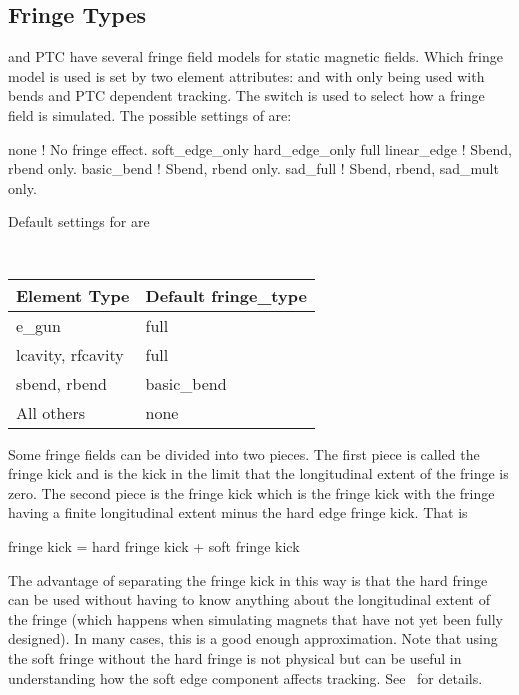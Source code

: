 {%
\subsection{Fringe Types}
\label{s:fringe.type}

\bmad and PTC have several fringe field models for static magnetic fields. Which fringe model is
used is set by two element attributes:  and  with
 only being used with bends and PTC dependent tracking.
The  switch is used to select how a fringe field is
simulated.  The possible settings of  are:
\begin{example}
  none              ! No fringe effect. 
  soft_edge_only
  hard_edge_only
  full
  linear_edge       ! Sbend, rbend only.
  basic_bend        ! Sbend, rbend only. 
  sad_full          ! Sbend, rbend, sad_mult only.
\end{example}
Default settings for  are
\newline\hspace*{0.1in}
{ \tt
\begin{tabular}{ll}
  Element Type        & Default fringe_type  \\ \midrule
  e_gun               & full                 \\
  lcavity, rfcavity   & full                 \\
  sbend, rbend        & basic_bend           \\
  All others          & none                 \\
  \bottomrule
\end{tabular}
}

Some fringe fields can be divided into two pieces.  The first piece is called the 
fringe kick and is the kick in the limit that the longitudinal extent of the fringe is zero. The
second piece is the  fringe kick which is the fringe kick with the fringe having a
finite longitudinal extent minus the hard edge fringe kick. That is
\begin{example}
  fringe kick = hard fringe kick + soft fringe kick
\end{example}
The advantage of separating the fringe kick in this way is that the hard fringe can be used without
having to know anything about the longitudinal extent of the fringe (which happens when simulating
magnets that have not yet been fully designed).  In many cases, this is a good enough
approximation. Note that using the soft fringe without the hard fringe is not physical but can be
useful in understanding how the soft edge component affects tracking. See~ for
details.

}
